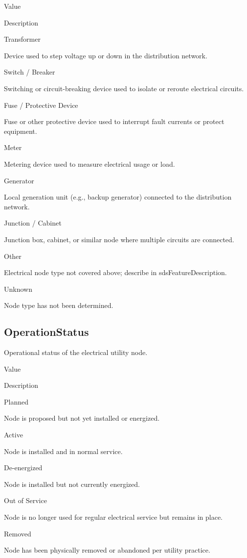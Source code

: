 \documentclass[
  letterpaper,
  DIV=11,
  numbers=noendperiod]{scrreprt}
\begin{document}
Value

Description

Transformer

Device used to step voltage up or down in the distribution network.

Switch / Breaker

Switching or circuit-breaking device used to isolate or reroute
electrical circuits.

Fuse / Protective Device

Fuse or other protective device used to interrupt fault currents or
protect equipment.

Meter

Metering device used to measure electrical usage or load.

Generator

Local generation unit (e.g., backup generator) connected to the
distribution network.

Junction / Cabinet

Junction box, cabinet, or similar node where multiple circuits are
connected.

Other

Electrical node type not covered above; describe in
sdsFeatureDescription.

Unknown

Node type has not been determined.

\subsection{OperationStatus}\label{operationstatus}

Operational status of the electrical utility node.

Value

Description

Planned

Node is proposed but not yet installed or energized.

Active

Node is installed and in normal service.

De-energized

Node is installed but not currently energized.

Out of Service

Node is no longer used for regular electrical service but remains in
place.

Removed

Node has been physically removed or abandoned per utility practice.
\end{document}
